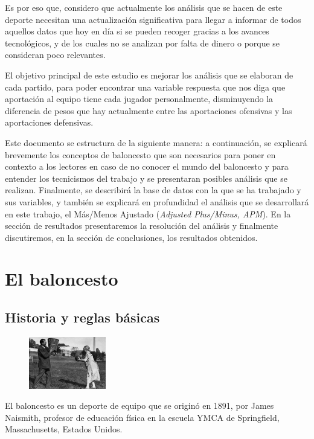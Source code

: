 \documentclass[paper=a4, fontsize=9pt]{article}
\begin{document}
Es por eso que, considero que actualmente los análisis que se hacen de este deporte necesitan una actualización significativa para llegar a informar de todos aquellos datos que hoy en día si se pueden recoger gracias a los avances tecnológicos, y de los cuales no se analizan por falta de dinero o porque se consideran poco relevantes.

El objetivo principal de este estudio es mejorar los análisis que se elaboran de cada partido, para poder encontrar una variable respuesta que nos diga que aportación al equipo tiene cada jugador personalmente, disminuyendo la diferencia de pesos que hay actualmente entre las aportaciones ofensivas y las aportaciones defensivas.

Este documento se estructura de la siguiente manera: a continuación, se explicará brevemente los conceptos de baloncesto que son necesarios para poner en contexto a los lectores en caso de no conocer el mundo del baloncesto y para entender los tecnicismos del trabajo y se presentaran posibles análisis que se realizan. Finalmente, se describirá la base de datos con la que se ha trabajado y sus variables, y también se explicará en profundidad el análisis que se desarrollará en este trabajo, el Más/Menos Ajustado (\emph{Adjusted Plus/Minus, APM}). En la sección de resultados presentaremos la resolución del análisis y finalmente discutiremos, en la sección de conclusiones, los resultados obtenidos.

\section{El baloncesto}

\subsection{Historia y reglas básicas}

\begin{figure}
\centering
\includegraphics[width=0.3\textwidth]{imagenes/historia_baloncesto.jpg}
\label{fig:hist_bskb}
\end{figure}

El baloncesto es un deporte de equipo que se originó en 1891, por James Naismith, profesor de educación física en la escuela YMCA de Springfield, Massachusetts, Estados Unidos.
\end{document}
